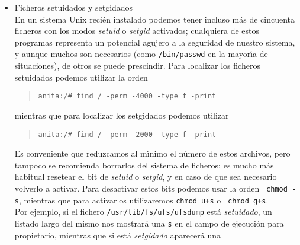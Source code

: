 \begin{itemize}
\begin{quote}
\begin{verbatim}
login:
\end{verbatim}
\end{quote}
\rm
Sin embargo, configurando {\it TCP-Wrapper} para que no admita conexiones desde 
fuera de la universidad, si alguien intenta lo mismo obtendr\'a un resultado
similar al siguiente:
\tt
\begin{quote}
\begin{verbatim}
luisa:~$ telnet anita
Trying 192.168.0.3...
Connected to anita.
Escape character is '^]'.
Connection closed by foreign host.
luisa:~$
\end{verbatim}
\end{quote}
\rm
De esta forma, incluso si el atacante conociera un nombre de usuario y su clave
le ser\'{\i}a m\'as dif\'{\i}cil acceder a nuestro equipo por {\it telnet}.
\item Ficheros setuidados y setgidados\\
En un sistema Unix reci\'en instalado podemos tener incluso m\'as de cincuenta
ficheros con los modos {\it setuid} o {\it setgid} activados; cualquiera de
estos programas representa un potencial agujero a la seguridad de nuestro 
sistema, y aunque muchos son necesarios (como {\tt /bin/passwd} en la 
mayor\'{\i}a de situaciones), de otros se puede prescindir. Para localizar los
ficheros setuidados podemos utilizar la orden
\tt
\begin{quote}
\begin{verbatim}
anita:/# find / -perm -4000 -type f -print
\end{verbatim}
\end{quote}
\rm
mientras que para localizar los setgidados podemos utilizar 
\tt
\begin{quote}
\begin{verbatim}
anita:/# find / -perm -2000 -type f -print
\end{verbatim}
\end{quote}
\rm
Es conveniente que reduzcamos al m\'{\i}nimo el n\'umero de estos archivos, pero
tampoco se recomienda borrarlos del sistema de ficheros; es mucho m\'as habitual
resetear el bit de {\it setuid} o {\it setgid}, y en caso de que sea necesario
volverlo a activar. Para desactivar estos bits podemos usar la orden {\tt
chmod -s}, mientras que para activarlos utilizaremos {\tt chmod u+s} o {\tt 
chmod g+s}.\\
Por ejemplo, si el fichero {\tt /usr/lib/fs/ufs/ufsdump} est\'a {\it setuidado},
un listado largo del mismo nos mostrar\'a una {\tt s} en el campo de ejecuci\'on
para propietario, mientras que si est\'a {\it setgidado} aparecer\'a una {\tt
}
\end{itemize}
